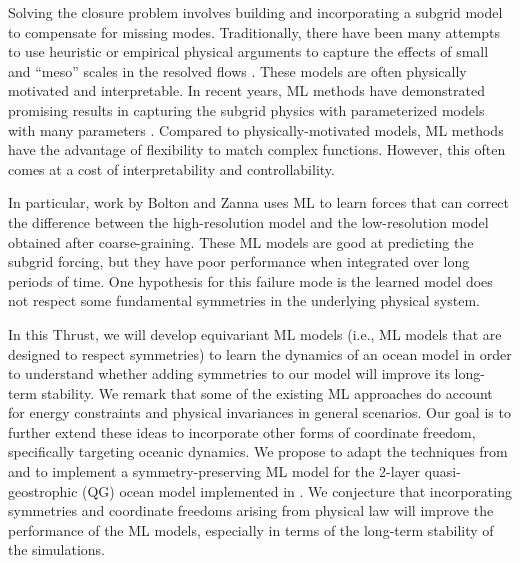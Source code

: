 \documentclass[11pt]{article}
\begin{document}
Solving the closure problem involves building and incorporating a subgrid model to compensate for missing modes.
Traditionally, there have been many attempts to use heuristic or empirical physical arguments to capture the effects of small and ``meso'' scales in the resolved flows \cite{thuburn2014cascades,jansen2014parameterizing, mana2014toward, zanna2017scale, bachman2017scale, pearson2017evaluation, bachman2018relationship, jansen2019toward, bachman2019gm, grooms2015numerical, berloff2018dynamically, juricke2020ocean}.
These models are often physically motivated and interpretable.
In recent years, ML methods have demonstrated promising results in capturing the subgrid physics with parameterized models with many parameters \cite{rasp2018deep, Bolton2019,maulik2019subgrid, beck2019deep, yuval2020stable, guan2022stable, beucler2021climate, shamekh2022implicit, wang2022non}.
Compared to physically-motivated models, ML methods have the advantage of flexibility to match complex functions.
However, this often comes at a cost of interpretability and controllability.

In particular, work by Bolton and Zanna \cite{Bolton2019} uses ML to learn forces that can correct the difference between the high-resolution model and the low-resolution model obtained after coarse-graining. These ML models are good at predicting the subgrid forcing, but they have poor performance when integrated over long periods of time. One hypothesis for this failure mode is the learned model does not respect some fundamental symmetries in the underlying physical system.

In this Thrust, we will develop equivariant ML models (i.e., ML models that are designed to respect symmetries) to learn the dynamics of an ocean model in order to understand whether adding symmetries to our model will improve its long-term stability.
We remark that some of the existing ML approaches do account for energy constraints \cite{guan2023learning} and physical invariances \cite{frezat2021physical, guan2023learning, pawar2023frame, Bolton2019} in general scenarios. Our goal is to further extend these ideas to incorporate other forms of coordinate freedom, specifically targeting oceanic dynamics. We propose to adapt the techniques from \cite{villar2021scalars} and \cite{xu2022pde} to implement a symmetry-preserving ML model for the 2-layer quasi-geostrophic (QG) ocean model implemented in \cite{pyqg}. We conjecture that incorporating symmetries and coordinate freedoms arising from physical law will improve the performance of the ML models, especially in terms of the long-term stability of the simulations.
\end{document}
